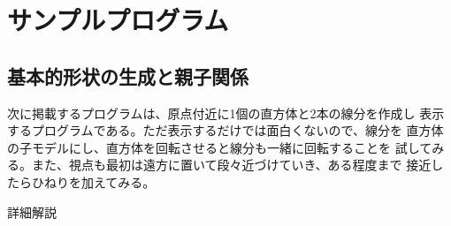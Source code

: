 \chapter{サンプルプログラム} \label{chap:sample}
\section{基本的形状の生成と親子関係}
次に掲載するプログラムは、原点付近に1個の直方体と2本の線分を作成し
表示するプログラムである。ただ表示するだけでは面白くないので、線分を
直方体の子モデルにし、直方体を回転させると線分も一緒に回転することを
試してみる。また、視点も最初は遠方に置いて段々近づけていき、ある程度まで
接近したらひねりを加えてみる。

\begin{center}
詳細解説
\end{center}

